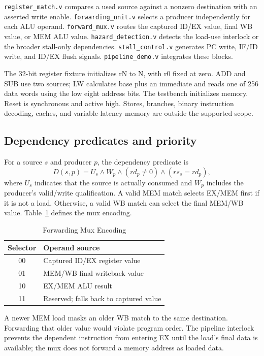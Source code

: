 \documentclass[conference]{IEEEtran}
\begin{document}
\texttt{register\_match.v} compares a used source against a nonzero destination with an asserted write enable. \texttt{forwarding\_unit.v} selects a producer independently for each ALU operand. \texttt{forward\_mux.v} routes the captured ID/EX value, final WB value, or MEM ALU value. \texttt{hazard\_detection.v} detects the load-use interlock or the broader stall-only dependencies. \texttt{stall\_control.v} generates PC write, IF/ID write, and ID/EX flush signals. \texttt{pipeline\_demo.v} integrates these blocks.

The 32-bit register fixture initializes rN to N, with r0 fixed at zero. ADD and SUB use two sources; LW calculates base plus an immediate and reads one of 256 data words using the low eight address bits. The testbench initializes memory. Reset is synchronous and active high. Stores, branches, binary instruction decoding, caches, and variable-latency memory are outside the supported scope.

\subsection{Dependency predicates and priority}
For a source $s$ and producer $p$, the dependency predicate is
\begin{equation}
D(s,p)=U_s\land W_p\land(rd_p\ne0)\land(rs_s=rd_p),
\end{equation}
where $U_s$ indicates that the source is actually consumed and $W_p$ includes the producer's valid/write qualification. A valid MEM match selects EX/MEM first if it is not a load. Otherwise, a valid WB match can select the final MEM/WB value. Table~\ref{tab:select} defines the mux encoding.

\begin{table}[t]
\caption{Forwarding Mux Encoding}
\label{tab:select}\centering
\begin{tabular}{cl}
\toprule Selector & Operand source\\\midrule
00 & Captured ID/EX register value\\
01 & MEM/WB final writeback value\\
10 & EX/MEM ALU result\\
11 & Reserved; falls back to captured value\\\bottomrule
\end{tabular}
\end{table}

A newer MEM load masks an older WB match to the same destination. Forwarding that older value would violate program order. The pipeline interlock prevents the dependent instruction from entering EX until the load's final data is available; the mux does not forward a memory address as loaded data.
\end{document}
